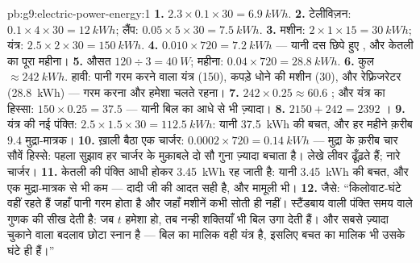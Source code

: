 \begin{solution}{pb:g9:electric-power-energy:1}
\textbf{1.} $2.3 \times 0.1 \times 30 = \qty{6.9}{kWh}$.
\textbf{2.} टेलीविज़न: $0.1 \times 4 \times 30 = \qty{12}{kWh}$;
लैंप: $0.05 \times 5 \times 30 = \qty{7.5}{kWh}$.
\textbf{3.} मशीन: $2 \times 1 \times 15 = \qty{30}{kWh}$; यंत्र:
$2.5 \times 2 \times 30 = \qty{150}{kWh}$.
\textbf{4.} $0.010 \times 720 = \qty{7.2}{kWh}$ --- यानी दस छिपे हुए
, और केतली का पूरा महीना।
\textbf{5.} औसत $120 \div 3 = \qty{40}{W}$; महीना: $0.04 \times 720
= \qty{28.8}{kWh}$.
\textbf{6.} कुल $\approx \qty{242}{kWh}$. हावी: पानी गरम करने वाला
यंत्र (\qty{150}{}), कपड़े धोने की मशीन (\qty{30}{}), और रेफ़्रिजरेटर
(\qty{28.8}{kWh}) --- गरम करना और हमेशा चलते रहना।
\textbf{7.} $242 \times 0.25 \approx 60.6$ ; और यंत्र का
हिस्सा: $150 \times 0.25 = 37.5$ --- यानी बिल का आधे से भी ज़्यादा।
\textbf{8.} $2150 + 242 = 2392$ ।
\textbf{9.} यंत्र की नई पंक्ति: $2.5 \times 1.5 \times 30 =
\qty{112.5}{kWh}$: यानी \qty{37.5}{kWh} की बचत, और हर महीने क़रीब
$9.4$ मुद्रा-मात्रक।
\textbf{10.} ख़ाली बैठा एक चार्जर: $0.0002 \times 720 =
\qty{0.14}{kWh}$ --- मुद्रा के क़रीब चार सौवें हिस्से: पहला सुझाव
हर चार्जर के मुक़ाबले दो सौ गुना ज़्यादा बचाता है। लेखे लीवर ढूँढ़ते
हैं; नारे चार्जर।
\textbf{11.} केतली की पंक्ति आधी होकर \qty{3.45}{kWh} रह जाती है:
यानी \qty{3.45}{kWh} की बचत, और एक मुद्रा-मात्रक से भी कम --- दादी जी
की आदत सही है, और मामूली भी।
\textbf{12.} जैसे: ``किलोवाट-घंटे वहीं रहते हैं जहाँ पानी गरम होता है
और जहाँ मशीनें कभी सोती ही नहीं। स्टैंडबाय वाली पंक्ति समय वाले गुणक
की सीख देती है: जब $t$ हमेशा हो, तब नन्ही शक्तियाँ भी बिल उगा देती
हैं। और सबसे ज़्यादा चुकाने वाला बदलाव छोटा स्नान है --- बिल का मालिक
वही यंत्र है, इसलिए बचत का मालिक भी उसके घंटे ही हैं।''
\end{solution}
